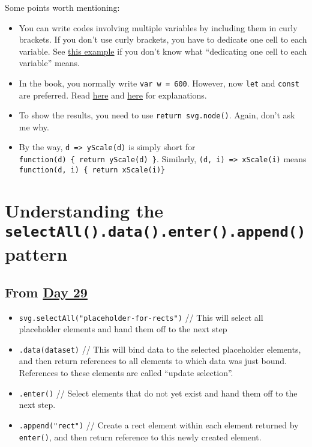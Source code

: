 \documentclass[
]{book}
\begin{document}
Some points worth mentioning:

\begin{itemize}
\item
  You can write codes involving multiple variables by including them in curly brackets. If you don't use curly brackets, you have to dedicate one cell to each variable. See \href{https://observablehq.com/@hongtaoh/bar-chart-cell-by-cell}{this example} if you don't know what ``dedicating one cell to each variable'' means.
\item
  In the book, you normally write \texttt{var\ w\ =\ 600}. However, now \texttt{let} and \texttt{const} are preferred. Read \href{https://www.freecodecamp.org/news/var-let-and-const-whats-the-difference/}{here} and \href{https://hackernoon.com/js-var-let-or-const-67e51dbb716f}{here} for explanations.
\item
  To show the results, you need to use \texttt{return\ svg.node()}. Again, don't ask me why.
\item
  By the way, \texttt{d\ =\textgreater{}\ yScale(d)} is simply short for \texttt{function(d)\ \{\ return\ yScale(d)\ \}}. Similarly, \texttt{(d,\ i)\ =\textgreater{}\ xScale(i)} means \texttt{function(d,\ i)\ \{\ return\ xScale(i)\}}
\end{itemize}

\hypertarget{understanding-the-selectall.data.enter.append-pattern}{%
\section{\texorpdfstring{Understanding the \texttt{selectAll().data().enter().append()} pattern}{Understanding the selectAll().data().enter().append() pattern}}\label{understanding-the-selectall.data.enter.append-pattern}}

\hypertarget{from-day-29}{%
\subsection{\texorpdfstring{From \href{https://observablehq.com/@hongtaoh/day-twenty-nine-2020-09-22}{Day 29}}{From Day 29}}\label{from-day-29}}

\begin{itemize}
\item
  \texttt{svg.selectAll("placeholder-for-rects")} // This will select all placeholder elements and hand them off to the next step
\item
  \texttt{.data(dataset)} // This will bind data to the selected placeholder elements, and then return references to all elements to which data was just bound. References to these elements are called ``update selection''.
\item
  \texttt{.enter()} // Select elements that do not yet exist and hand them off to the next step.
\item
  \texttt{.append("rect")} // Create a rect element within each element returned by \texttt{enter()}, and then return reference to this newly created element.
\end{itemize}
\end{document}
